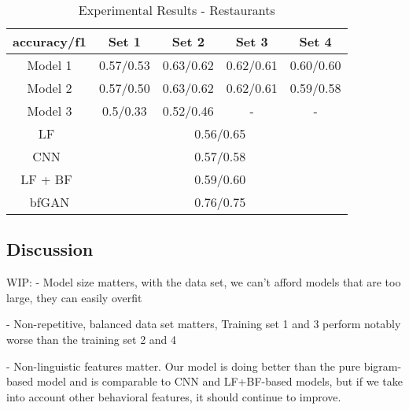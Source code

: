 \documentclass[conference, 11pt]{IEEEtran} %
\theoremstyle{plain}
\theoremstyle{definition}
\begin{document}
\begin{table}[H]
\small
\caption{Experimental Results - Restaurants}
\centering
\begin{tabular}{|c|c|c|c|c|}
\hline
 accuracy/f1 & Set 1 & Set 2 & Set 3 & Set 4 \\ \hline
Model 1 & 0.57/0.53 & 0.63/0.62 & 0.62/0.61 & 0.60/0.60 \\ \hline
Model 2 & 0.57/0.50 & 0.63/0.62 & 0.62/0.61 & 0.59/0.58 \\ \hline
Model 3 & 0.5/0.33 & 0.52/0.46 & - & - \\ \hline
LF~\cite{Tang2020} & \multicolumn{4}{c|}{0.56/0.65} \\ \hline
CNN~\cite{Tang2020} & \multicolumn{4}{c|}{0.57/0.58} \\ \hline
LF + BF~\cite{Tang2020} & \multicolumn{4}{c|}{0.59/0.60} \\ \hline
bfGAN\cite{Tang2020}& \multicolumn{4}{c|}{0.76/0.75} \\
\hline
\end{tabular}
\label{exp-restaurants}

\end{table}




\subsection{Discussion}
WIP:
- Model size matters, with the data set, we can't afford models that are too large, they can easily overfit

- Non-repetitive, balanced data set matters, Training set 1 and 3 perform notably worse than the training set 2 and 4

- Non-linguistic features matter. Our model is doing better than the pure bigram-based model and is comparable to CNN and LF+BF-based models, but if we take into account other behavioral features, it should continue to improve.
\end{document}
